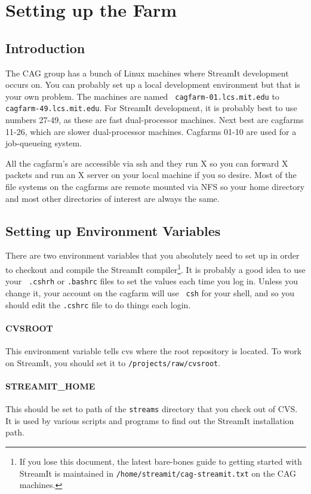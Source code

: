\section{Setting up the Farm}

\subsection{Introduction}
The CAG group has a bunch of Linux machines where StreamIt development
occurs on. You can probably set up a local development environment but
that is your own problem. The machines are named {\tt
cagfarm-01.lcs.mit.edu} to {\tt cagfarm-49.lcs.mit.edu}. For StreamIt
development, it is probably best to use numbers 27-49, as these are
fast dual-processor machines.  Next best are cagfarms 11-26, which are
slower dual-processor machines.  Cagfarms 01-10 are used for a
job-queueing system.

All the cagfarm's are accessible via ssh and they run X so you can
forward X packets and run an X server on your local machine if you so
desire. Most of the file systems on the cagfarms are remote mounted
via NFS so your home directory and most other directories of interest
are always the same.

\subsection{Setting up Environment Variables}
There are two environment variables that you absolutely need to set up
in order to checkout and compile the StreamIt compiler\footnote{If you
lose this document, the latest bare-bones guide to getting started
with StreamIt is maintained in {\tt /home/streamit/cag-streamit.txt}
on the CAG machines.}. It is probably a good idea to use your {\tt
.cshrh} or {\tt .bashrc} files to set the values each time you log
in. Unless you change it, your account on the cagfarm will use {\tt
csh} for your shell, and so you should edit the {\tt .cshrc} file to
do things each login.

\paragraph{CVSROOT}
This environment variable tells cvs where the root repository is 
located. To work on StreamIt, you should set it to 
{\tt /projects/raw/cvsroot}.

\paragraph{STREAMIT\_HOME}
This should be set to path of the {\tt streams} directory that 
you check out of CVS. It is used by various scripts and programs
to find out the StreamIt installation path.

